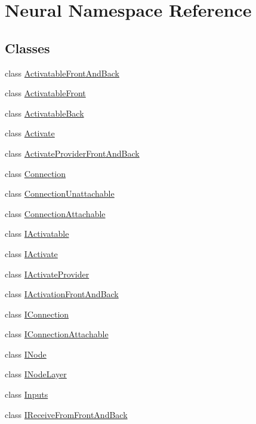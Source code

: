 \hypertarget{namespace_neural}{
\section{Neural Namespace Reference}
\label{namespace_neural}
}
\subsection*{Classes}
\begin{DoxyCompactItemize}
\item 
class \hyperlink{class_neural_1_1_activatable_front_and_back}{ActivatableFrontAndBack}
\item 
class \hyperlink{class_neural_1_1_activatable_front}{ActivatableFront}
\item 
class \hyperlink{class_neural_1_1_activatable_back}{ActivatableBack}
\item 
class \hyperlink{class_neural_1_1_activate}{Activate}
\item 
class \hyperlink{class_neural_1_1_activate_provider_front_and_back}{ActivateProviderFrontAndBack}
\item 
class \hyperlink{class_neural_1_1_connection}{Connection}
\item 
class \hyperlink{class_neural_1_1_connection_unattachable}{ConnectionUnattachable}
\item 
class \hyperlink{class_neural_1_1_connection_attachable}{ConnectionAttachable}
\item 
class \hyperlink{class_neural_1_1_i_activatable}{IActivatable}
\item 
class \hyperlink{class_neural_1_1_i_activate}{IActivate}
\item 
class \hyperlink{class_neural_1_1_i_activate_provider}{IActivateProvider}
\item 
class \hyperlink{class_neural_1_1_i_activation_front_and_back}{IActivationFrontAndBack}
\item 
class \hyperlink{class_neural_1_1_i_connection}{IConnection}
\item 
class \hyperlink{class_neural_1_1_i_connection_attachable}{IConnectionAttachable}
\item 
class \hyperlink{class_neural_1_1_i_node}{INode}
\item 
class \hyperlink{class_neural_1_1_i_node_layer}{INodeLayer}
\item 
class \hyperlink{class_neural_1_1_inputs}{Inputs}
\item 
class \hyperlink{class_neural_1_1_i_receive_from_front_and_back}{IReceiveFromFrontAndBack}

\end{DoxyCompactItemize}
